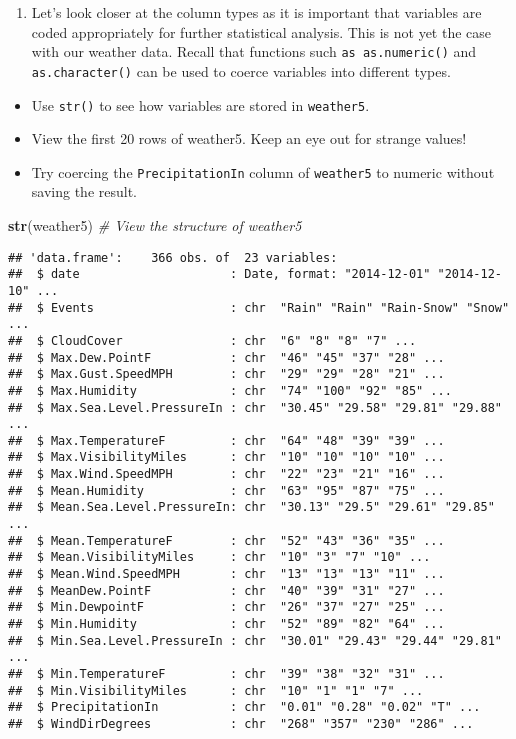 \documentclass[]{article}
\newenvironment{Shaded}{\begin{snugshade}}{\end{snugshade}}
\newcommand{\KeywordTok}[1]{\textcolor[rgb]{0.13,0.29,0.53}{\textbf{#1}}}
\newcommand{\CommentTok}[1]{\textcolor[rgb]{0.56,0.35,0.01}{\textit{#1}}}
\newcommand{\NormalTok}[1]{#1}
\providecommand{\tightlist}{%
  \setlength{\itemsep}{0pt}\setlength{\parskip}{0pt}}
\begin{document}
\begin{enumerate}
\def\labelenumi{\arabic{enumi}.}
\setcounter{enumi}{5}
\tightlist
\item
  Let's look closer at the column types as it is important that
  variables are coded appropriately for further statistical analysis.
  This is not yet the case with our weather data. Recall that functions
  such \texttt{as\ as.numeric()} and \texttt{as.character()} can be used
  to coerce variables into different types.
\end{enumerate}

\begin{itemize}
\item
  Use \texttt{str()} to see how variables are stored in
  \texttt{weather5}.
\item
  View the first 20 rows of weather5. Keep an eye out for strange
  values!
\item
  Try coercing the \texttt{PrecipitationIn} column of \texttt{weather5}
  to numeric without saving the result.
\end{itemize}

\begin{Shaded}
\begin{Highlighting}[]
\KeywordTok{str}\NormalTok{(weather5) }\CommentTok{# View the structure of weather5}
\end{Highlighting}
\end{Shaded}

\begin{verbatim}
## 'data.frame':    366 obs. of  23 variables:
##  $ date                     : Date, format: "2014-12-01" "2014-12-10" ...
##  $ Events                   : chr  "Rain" "Rain" "Rain-Snow" "Snow" ...
##  $ CloudCover               : chr  "6" "8" "8" "7" ...
##  $ Max.Dew.PointF           : chr  "46" "45" "37" "28" ...
##  $ Max.Gust.SpeedMPH        : chr  "29" "29" "28" "21" ...
##  $ Max.Humidity             : chr  "74" "100" "92" "85" ...
##  $ Max.Sea.Level.PressureIn : chr  "30.45" "29.58" "29.81" "29.88" ...
##  $ Max.TemperatureF         : chr  "64" "48" "39" "39" ...
##  $ Max.VisibilityMiles      : chr  "10" "10" "10" "10" ...
##  $ Max.Wind.SpeedMPH        : chr  "22" "23" "21" "16" ...
##  $ Mean.Humidity            : chr  "63" "95" "87" "75" ...
##  $ Mean.Sea.Level.PressureIn: chr  "30.13" "29.5" "29.61" "29.85" ...
##  $ Mean.TemperatureF        : chr  "52" "43" "36" "35" ...
##  $ Mean.VisibilityMiles     : chr  "10" "3" "7" "10" ...
##  $ Mean.Wind.SpeedMPH       : chr  "13" "13" "13" "11" ...
##  $ MeanDew.PointF           : chr  "40" "39" "31" "27" ...
##  $ Min.DewpointF            : chr  "26" "37" "27" "25" ...
##  $ Min.Humidity             : chr  "52" "89" "82" "64" ...
##  $ Min.Sea.Level.PressureIn : chr  "30.01" "29.43" "29.44" "29.81" ...
##  $ Min.TemperatureF         : chr  "39" "38" "32" "31" ...
##  $ Min.VisibilityMiles      : chr  "10" "1" "1" "7" ...
##  $ PrecipitationIn          : chr  "0.01" "0.28" "0.02" "T" ...
##  $ WindDirDegrees           : chr  "268" "357" "230" "286" ...
\end{verbatim}
\end{document}
